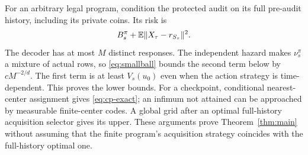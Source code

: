 For an arbitrary legal program, condition the protected audit on its full pre-audit history, including its private coins. Its risk is
\[
 B_s^\pi+\mathbb E\lVert X_\tau-r_{S_\tau}\rVert^2.
\]
The decoder has at most $M$ distinct responses. The independent hazard makes $\nu_s^\pi$ a mixture of actual rows, so \eqref{eq:smallball} bounds the second term below by $cM^{-2/d}$. The first term is at least $V_s(u_0)$ even when the action strategy is time-dependent. This proves the lower bounds. For a checkpoint, conditional nearest-center assignment gives \eqref{eq:cp-exact}; an infimum not attained can be approached by measurable finite-center codes. A global grid after an optimal full-history acquisition selector gives its upper. These arguments prove Theorem~\ref{thm:main} without assuming that the finite program's acquisition strategy coincides with the full-history optimal one.
